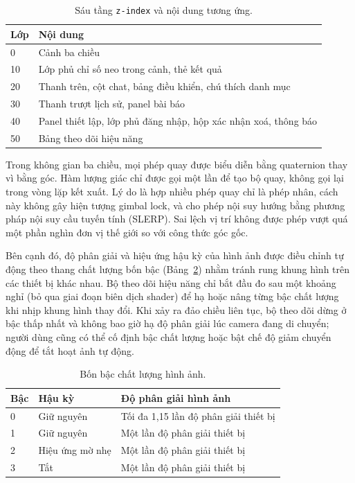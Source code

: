 \begin{table}[htbp]
    \centering
    \caption{Sáu tầng \texttt{z-index} và nội dung tương ứng.}
    \label{tab:sau-lop-phu}
    \small
    \begin{tabularx}{\textwidth}{@{}l>{\raggedright\arraybackslash}X@{}}
        \toprule
        \textbf{Lớp} & \textbf{Nội dung} \\
        \midrule
        0 & Cảnh ba chiều \\
        10 & Lớp phủ chỉ số neo trong cảnh, thẻ kết quả \\
        20 & Thanh trên, cột chat, bảng điều khiển, chú thích danh mục \\
        30 & Thanh trượt lịch sử, panel bài báo \\
        40 & Panel thiết lập, lớp phủ đăng nhập, hộp xác nhận xoá, thông báo \\
        50 & Bảng theo dõi hiệu năng \\
        \bottomrule
    \end{tabularx}
\end{table}

Trong không gian ba chiều, mọi phép quay được biểu diễn bằng quaternion thay vì bằng góc. Hàm lượng giác chỉ được gọi một lần để tạo bộ quay, không gọi lại trong vòng lặp kết xuất. Lý do là hợp nhiều phép quay chỉ là phép nhân, cách này không gây hiện tượng gimbal lock, và cho phép nội suy hướng bằng phương pháp nội suy cầu tuyến tính (SLERP). Sai lệch vị trí không được phép vượt quá một phần nghìn đơn vị thế giới so với công thức góc gốc.

Bên cạnh đó, độ phân giải và hiệu ứng hậu kỳ của hình ảnh được điều chỉnh tự động theo thang chất lượng bốn bậc (Bảng~\ref{tab:bon-bac-chat-luong}) nhằm tránh rung khung hình trên các thiết bị khác nhau. Bộ theo dõi hiệu năng chỉ bắt đầu đo sau một khoảng nghỉ (bỏ qua giai đoạn biên dịch shader) để hạ hoặc nâng từng bậc chất lượng khi nhịp khung hình thay đổi. Khi xảy ra đảo chiều liên tục, bộ theo dõi dừng ở bậc thấp nhất và không bao giờ hạ độ phân giải lúc camera đang di chuyển; người dùng cũng có thể cố định bậc chất lượng hoặc bật chế độ giảm chuyển động để tắt hoạt ảnh tự động.

\begin{table}[htbp]
    \centering
    \caption{Bốn bậc chất lượng hình ảnh.}
    \label{tab:bon-bac-chat-luong}
    \small
    \begin{tabularx}{\textwidth}{@{}l>{\raggedright\arraybackslash}p{3.6cm}>{\raggedright\arraybackslash}X@{}}
        \toprule
        \textbf{Bậc} & \textbf{Hậu kỳ} & \textbf{Độ phân giải hình ảnh} \\
        \midrule
        0 & Giữ nguyên & Tối đa 1,15 lần độ phân giải thiết bị \\
        1 & Giữ nguyên & Một lần độ phân giải thiết bị \\
        2 & Hiệu ứng mờ nhẹ & Một lần độ phân giải thiết bị \\
        3 & Tắt & Một lần độ phân giải thiết bị \\
        \bottomrule
    \end{tabularx}
\end{table}

